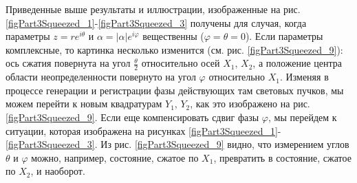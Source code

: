 Приведенные выше результаты и иллюстрации, изображенные на
рис. \ref{figPart3Squeezed_1}-\ref{figPart3Squeezed_3} получены для
случая, когда параметры $z = r e^{i\theta}$ и $\alpha =
\left|\alpha\right|e^{i \varphi}$ вещественны ($\varphi = \theta =
0$). Если параметры комплексные, то картинка несколько изменится
(см. рис. \ref{figPart3Squeezed_9}): ось сжатия повернута на угол $\frac{\theta}{2}$
относительно осей $X_1$, $X_2$, а положение центра области
неопределенности повернуто на угол $\varphi$ относительно
$X_1$. Изменяя в процессе генерации и регистрации фазы действующих там
световых пучков, мы можем перейти к новым квадратурам $Y_1$, $Y_2$, как
это изображено на рис. \ref{figPart3Squeezed_9}. Если еще компенсировать сдвиг фазы
$\varphi$, мы перейдем к ситуации, которая изображена на рисунках 
\ref{figPart3Squeezed_1}-\ref{figPart3Squeezed_3}. Из рис. 
\ref{figPart3Squeezed_9} видно, что измерением углов $\theta$ и
$\varphi$ можно, например, состояние, сжатое по $X_1$, превратить в
состояние, сжатое по $X_2$, и наоборот.
